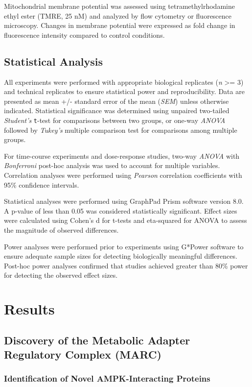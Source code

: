 \documentclass[11pt,a4paper]{article}
\begin{document}
Mitochondrial membrane potential was assessed using tetramethylrhodamine ethyl ester (TMRE, 25 nM) and analyzed by flow cytometry or fluorescence microscopy. Changes in membrane potential were expressed as fold change in fluorescence intensity compared to control conditions.

\subsection{Statistical Analysis}

All experiments were performed with appropriate biological replicates (\textit{n} >= 3) and technical replicates to ensure statistical power and reproducibility. Data are presented as mean +/- standard error of the mean (\textit{SEM}) unless otherwise indicated. Statistical significance was determined using unpaired two-tailed \textit{Student's} \texttt{t}-test for comparisons between two groups, or one-way \textit{ANOVA} followed by \textit{Tukey's} multiple comparison test for comparisons among multiple groups.

For time-course experiments and dose-response studies, two-way \textit{ANOVA} with \textit{Bonferroni} post-hoc analysis was used to account for multiple variables. Correlation analyses were performed using \textit{Pearson} correlation coefficients with 95\% confidence intervals.

Statistical analyses were performed using GraphPad Prism software version 8.0. A p-value of less than 0.05 was considered statistically significant. Effect sizes were calculated using Cohen's d for t-tests and eta-squared for ANOVA to assess the magnitude of observed differences.

Power analyses were performed prior to experiments using G*Power software to ensure adequate sample sizes for detecting biologically meaningful differences. Post-hoc power analyses confirmed that studies achieved greater than 80\% power for detecting the observed effect sizes.

\section{Results}

\subsection{Discovery of the Metabolic Adapter Regulatory Complex (MARC)}

\subsubsection{Identification of Novel AMPK-Interacting Proteins}
\end{document}
